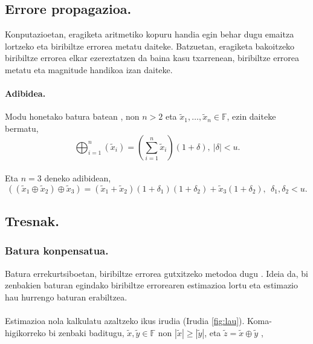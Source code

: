 \subsection*{Errore propagazioa.}

Konputazioetan, eragiketa aritmetiko kopuru handia egin behar dugu emaitza lortzeko eta biribiltze errorea metatu daiteke. Batzuetan, eragiketa bakoitzeko biribiltze errorea elkar ezereztatzen da baina kasu txarrenean, biribiltze errorea metatu eta magnitude handikoa izan daiteke.   

\paragraph*{\textbf{Adibidea}.} 
Modu honetako batura batean , non $n>2$ eta $\tilde x_1,\dots,\tilde x_n \in \mathbb{F}$,  ezin daiteke bermatu,  
\begin{equation*}
\bigoplus_{i=1}^{n}(\tilde x_i)=(\sum\limits_{i=1}^{n} \tilde x_i)(1+\delta), \ |\delta|<u.
\end{equation*}

\paragraph*{}Eta $n=3$ deneko adibidean,
\begin{equation*}
((\tilde x_1 \oplus \tilde x_2) \oplus \tilde x_3)  = 
  (\tilde x_1 + \tilde x_2)(1+\delta_1)(1+\delta_2)
  +\tilde x_3 (1+\delta_2), \ \ \delta_1,\delta_2<u.
\end{equation*}

\subsection{Tresnak.}
\subsubsection*{Batura konpensatua.}
   
Batura errekurtsiboetan, biribiltze errorea gutxitzeko metodoa dugu \cite{Higham2002}.
Ideia da, bi zenbakien baturan egindako biribiltze errorearen estimazioa lortu eta estimazio hau hurrengo baturan erabiltzea.

\paragraph*{} Estimazioa nola kalkulatu azaltzeko ikus irudia (Irudia \ref{fig:lau}). Koma-higikorreko bi zenbaki baditugu, $\tilde x,\tilde y \in \mathbb{F}$ non $|\tilde x| \geq |\tilde y|$, eta $\tilde z= \tilde x \oplus \tilde y$ ,

